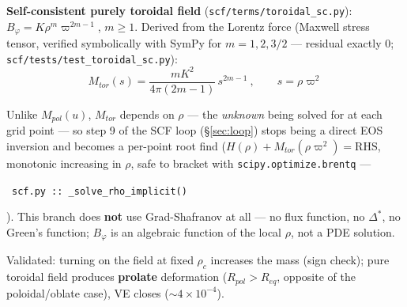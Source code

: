\documentclass[11pt,a4paper]{scrartcl}
\newcommand{\arrowto}[1]{%
  \par\vspace{2pt}\noindent{\color{linkblue}$\rightarrow$}~\texttt{\small #1}\par\vspace{2pt}}
\newcommand{\code}[1]{\texttt{\small #1}}
\begin{document}
\textbf{Self-consistent purely toroidal field}
(\code{scf/terms/toroidal\_sc.py}): $B_\varphi = K\rho^m\varpi^{2m-1}$,
$m\ge1$. Derived from the Lorentz force (Maxwell stress tensor, verified
symbolically with SymPy for $m=1,2,3/2$ --- residual exactly 0;
\code{scf/tests/test\_toroidal\_sc.py}):
\begin{equation}
M_{tor}(s) = \frac{mK^2}{4\pi(2m-1)}\,s^{2m-1}\ ,\qquad s=\rho\varpi^2
\end{equation}

Unlike $M_{pol}(u)$, $M_{tor}$ depends on $\rho$ --- the \emph{unknown}
being solved for at each grid point --- so step 9 of the SCF loop
(\S\ref{sec:loop}) stops being a direct EOS inversion and becomes a
per-point root find ($H(\rho)+M_{tor}(\rho\varpi^2)=\mathrm{RHS}$,
monotonic increasing in $\rho$, safe to bracket with
\code{scipy.optimize.brentq} --- \arrowto{scf.py :: \_solve\_rho\_implicit()}). This branch does \textbf{not} use Grad-Shafranov at all --- no flux function, no $\Delta^*$, no Green's function; $B_\varphi$ is an algebraic function of the local $\rho$, not a PDE solution.

Validated: turning on the field at fixed $\rho_c$ increases the mass
(sign check); pure toroidal field produces \textbf{prolate} deformation
($R_{pol}>R_{eq}$, opposite of the poloidal/oblate case), VE closes
($\sim4\times10^{-4}$).
\end{document}

